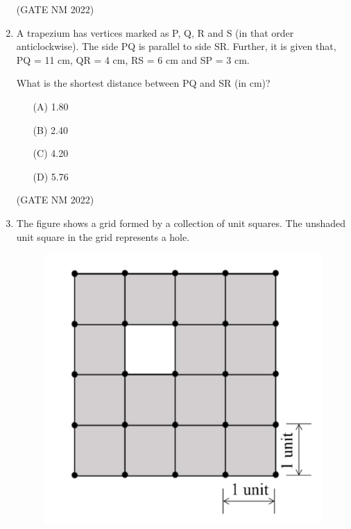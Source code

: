 \documentclass[journal,12pt,onecolumn]{IEEEtran}
\theoremstyle{remark}
\begin{document}
\begin{enumerate}
\hfill(GATE NM 2022)





\item  A trapezium has vertices marked as P, Q, R and S (in that order anticlockwise).  
The side PQ is parallel to side SR. Further, it is given that,  
PQ = 11 cm, QR = 4 cm, RS = 6 cm and SP = 3 cm.  

What is the shortest distance between PQ and SR (in cm)?\\[8pt]

\begin{multicols}{4}

\begin{enumerate}

	\item[(A)] 1.80 \\
	\item[(B)] 2.40 \\
	\item[(C)] 4.20 \\
	\item[(D)] 5.76 \\

\end{enumerate}

\end{multicols}

\hfill(GATE NM 2022)





\item  The figure shows a grid formed by a collection of unit squares. The unshaded unit square in the grid represents a hole.  

	\newpage

	\begin{figure}[h]
		\centering
	\includegraphics[width=0.5\columnwidth]{fig1}
	\caption{}
	\label{fig:placeholder}
	\end{figure}



\end{enumerate}
\end{document}
